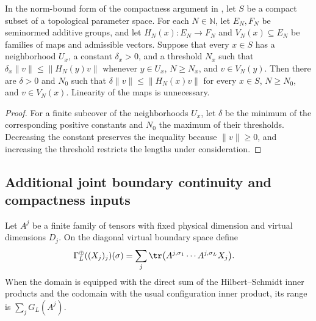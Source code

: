 \begin{lemma}
    \label{thm:compact_norm_lower_bound_tail}
    \leanok
    In the norm-bound form of the compactness argument in
    \cite[Appendix~A]{Schuch2011Phases}, let $S$ be a compact subset of a
    topological parameter space. For each
    $N\in\mathbb N$, let $E_N,F_N$ be seminormed additive groups, and let
    $H_N(x):E_N\to F_N$ and $V_N(x)\subseteq E_N$ be families of maps and
    admissible vectors. Suppose that every $x\in S$ has a neighborhood
    $U_x$, a constant $\delta_x>0$, and a threshold $N_x$ such that
    $\delta_x\|v\|\leq\|H_N(y)v\|$ whenever $y\in U_x$, $N\geq N_x$,
    and $v\in V_N(y)$. Then there are $\delta>0$ and $N_0$ such that
    $\delta\|v\|\leq\|H_N(x)v\|$ for every $x\in S$, $N\geq N_0$,
    and $v\in V_N(x)$. Linearity of the maps is unnecessary.
\end{lemma}
\begin{proof}\leanok
    For a finite subcover of the neighborhoods $U_x$, let $\delta$ be
    the minimum of the corresponding positive constants and $N_0$ the
    maximum of their thresholds. Decreasing the constant preserves the
    inequality because $\|v\|\geq0$, and increasing the threshold restricts
    the lengths under consideration.
\end{proof}

\subsection{Additional joint boundary continuity and compactness inputs}

\begin{definition}
    \label{def:block_ground_space_map}
    \leanok
    Let $A^j$ be a finite family of tensors with fixed physical dimension and
    virtual dimensions $D_j$. On the diagonal virtual boundary space define
    \begin{align}
        \Gamma_L^{\oplus}((X_j)_j)(\sigma)
         & =\sum_j\tr\bigl(A^{j,\sigma_1}\cdots A^{j,\sigma_L}X_j\bigr).
        \label{eq:block_ground_space_map}
    \end{align}
    When the domain is equipped with the direct sum of the Hilbert--Schmidt
    inner products and the codomain with the usual configuration inner
    product, its range is $\sum_jG_L(A^j)$.
\end{definition}

